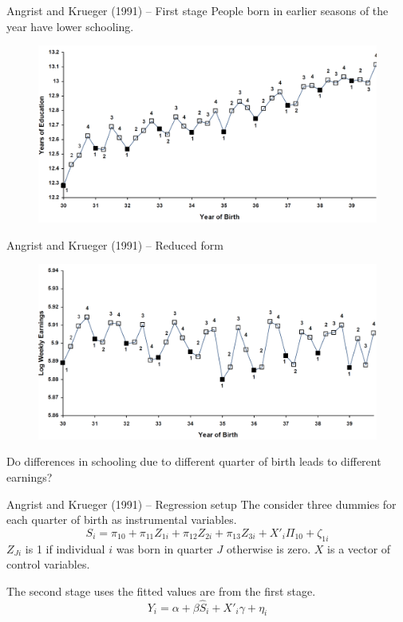 \documentclass{beamer}
\begin{document}
\begin{frame}{Angrist and Krueger (1991) -- First stage}
People born in earlier seasons of the year have lower schooling.
\begin{figure}
\centering
\includegraphics[width=.8\linewidth]{./Figures/angristkrueger2}
\end{figure}

\end{frame}

\begin{frame}{Angrist and Krueger (1991) -- Reduced form}
\begin{figure}
\centering
\includegraphics[width=.8\linewidth]{./Figures/angristkrueger3}
\end{figure}
Do differences in schooling due to different quarter of birth leads to different earnings?
\end{frame}

\begin{frame}{Angrist and Krueger (1991) -- Regression setup}
The consider three dummies for each quarter of birth as instrumental variables.
\[ S_i = \pi_{10} + \pi_{11}Z_{1i} + \pi_{12}Z_{2i} + \pi_{13}Z_{3i}+ X'_i\Pi_{10} + \zeta_{1i}\]
$Z_{Ji}$ is 1 if individual $i$ was born in quarter $J$ otherwise is zero. $X$ is a vector of control variables.\bigskip

The second stage uses the fitted values are from the first stage.
\[Y_i = \alpha + \beta \hat{S}_i+ X'_i\gamma + \eta_{i} \]
\end{frame}
\end{document}
